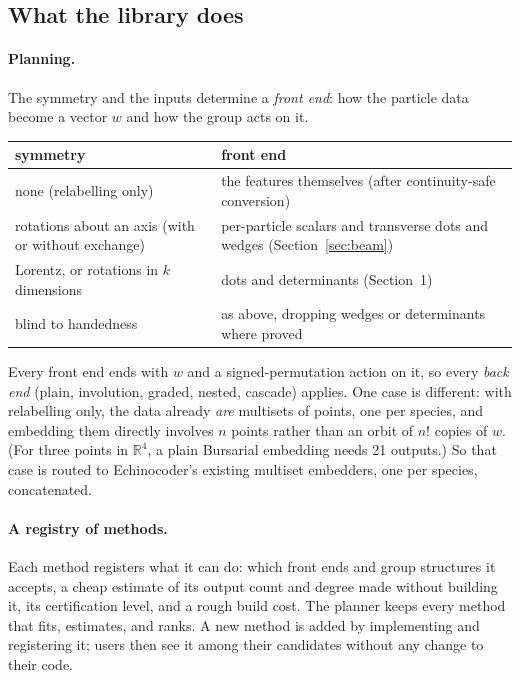 \documentclass[11pt]{article}
\theoremstyle{definition}
\theoremstyle{remark}
\begin{document}
\subsection{What the library does}

\paragraph{Planning.} The symmetry and the inputs determine a \emph{front end}:
how the particle data become a vector $w$ and how the group acts on it.
\begin{center}
\small
\begin{tabular}{p{}p{}}
  symmetry & front end \\ \hline
  none (relabelling only) & the features themselves (after continuity-safe
    conversion) \\
  rotations about an axis (with or without exchange) & per-particle scalars and
    transverse dots and wedges (Section~\ref{sec:beam}) \\
  Lorentz, or rotations in $k$ dimensions & dots and determinants
    (Section~1) \\
  blind to handedness & as above, dropping wedges or determinants where proved
\end{tabular}
\end{center}
Every front end ends with $w$ and a signed-permutation action on it, so every
\emph{back end} (plain, involution, graded, nested, cascade) applies. One case
is different: with relabelling only, the data already \emph{are} multisets of
points, one per species, and embedding them directly involves $n$ points rather
than an orbit of $n!$ copies of $w$. (For three points in $\mathbb{R}^4$, a
plain Bursarial embedding needs 21 outputs.) So that case is routed to
Echinocoder's existing multiset embedders, one per species, concatenated.

\paragraph{A registry of methods.} Each method registers what it can do:
which front ends and group structures it accepts, a cheap estimate of its
output count and degree made without building it, its certification level,
and a rough build cost. The planner keeps every method that fits, estimates,
and ranks. A new method is added by implementing and registering it; users then
see it among their candidates without any change to their code.
\end{document}
